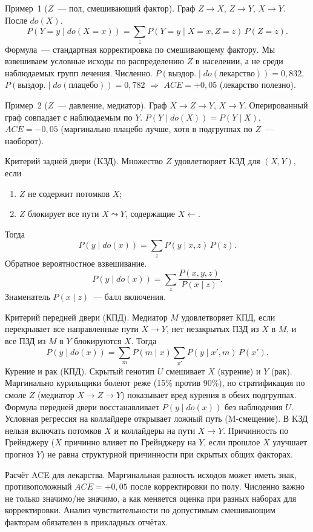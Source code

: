 Пример~1 ($Z$~--- пол, смешивающий фактор). Граф $Z\to X$, $Z\to Y$, $X\to Y$. После $do(X)$.
\[ P(Y=y\mid do(X=x)) = \sum_z P(Y=y\mid X=x,Z=z)\,P(Z=z).
\]
Формула~--- стандартная корректировка по смешивающему фактору. Мы взвешиваем условные исходы по распределению $Z$ в населении, а не среди наблюдаемых групп лечения.
Численно. $P(\text{выздор.}\mid do(\text{лекарство}))=0{,}832$, $P(\text{выздор.}\mid do(\text{плацебо}))=0{,}782$ $\Rightarrow$ $ACE=+0{,}05$ (лекарство полезно).

Пример~2 ($Z$~--- давление, медиатор). Граф $X\to Z\to Y$, $X\to Y$. Оперированный граф совпадает с наблюдаемым по $Y$. $P(Y\mid do(X))=P(Y\mid X)$, $ACE=-0{,}05$ (маргинально плацебо лучше, хотя в подгруппах по $Z$~--- наоборот).

Критерий задней двери (KЗД). Множество $Z$ удовлетворяет KЗД для $(X,Y)$, если
\begin{enumerate}
    \item $Z$ не содержит потомков $X$;
    \item $Z$ блокирует все пути $X\leadsto Y$, содержащие $X\leftarrow$.
\end{enumerate}
Тогда
\[ P(y\mid do(x))=\sum_z P(y\mid x,z)\,P(z).
\]
Обратное вероятностное взвешивание.\[ P(y\mid do(x))=\sum_z \frac{P(x,y,z)}{P(x\mid z)}.
\]
Знаменатель $P(x\mid z)$~--- балл включения.

Критерий передней двери (КПД). Медиатор $M$ удовлетворяет КПД, если перекрывает все направленные пути $X\to Y$, нет незакрытых ПЗД из $X$ в $M$, и все ПЗД из $M$ в $Y$ блокируются $X$. Тогда
\[ P(y\mid do(x))=\sum_m P(m\mid x)\sum_{x'}P(y\mid x',m)\,P(x').
\]
Курение и рак (КПД). Скрытый генотип $U$ смешивает $X$ (курение) и $Y$ (рак). Маргинально курильщики болеют реже (15\% против 90\%), но стратификация по смоле $Z$ (медиатор $X\to Z\to Y$) показывает вред курения в обеих подгруппах.
Формула передней двери восстанавливает $P(y\mid do(x))$ без наблюдения $U$.
Условная регрессия на коллайдере открывает ложный путь (M-смещение).
В KЗД нельзя включать потомков $X$ и коллайдеры на пути $X\to Y$.
Причинность по Грейнджеру ($X$ причинно влияет по Грейнджеру на $Y$, если прошлое $X$ улучшает прогноз $Y$) не равна структурной причинности при скрытых общих факторах.

Расчёт ACE для лекарства. Маргинальная разность исходов может иметь знак, противоположный $ACE=+0{,}05$ после корректировки по полу.
Численно важно не только значимо/не значимо, а как меняется оценка при разных наборах для корректировки. Анализ чувствительности по допустимым смешивающим факторам обязателен в прикладных отчётах.

